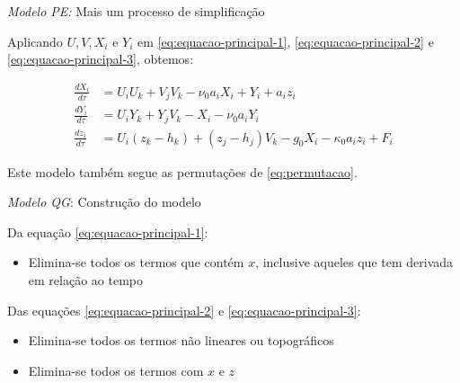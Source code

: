 
\begin{frame}{\textit{Modelo PE:} Mais um processo de simplificação}

Aplicando $U, V, X_i$ e $Y_i$ em \eqref{eq:equacao-principal-1}, \eqref{eq:equacao-principal-2} e \eqref{eq:equacao-principal-3}, obtemos:

\begin{align}
    \frac{dX_i}{d\tau} &= U_iU_k + V_jV_k - \nu_0a_iX_i + Y_i + a_iz_i \label{eq:equacao-principal-simplificada-1}\\
    \frac{dY_i}{d\tau} &= U_iY_k + Y_jV_k - X_i - \nu_0a_iY_i \label{eq:equacao-principal-simplificada-2}\\
    \frac{dz_i}{d\tau} &= U_i(z_k - h_k) + (z_j - h_j)V_k - g_0X_i - \kappa_0a_iz_i + F_i \label{eq:equacao-principal-simplificada-3}
\end{align}

Este modelo também segue as permutações de \eqref{eq:permutacao}.

\end{frame}


\begin{frame}{\textit{Modelo QG}: Construção do modelo}

Da equação \eqref{eq:equacao-principal-1}:
\begin{itemize}
    \item Elimina-se todos os termos que contém $x$, inclusive aqueles que tem derivada em relação ao tempo
\end{itemize}

Das equações \eqref{eq:equacao-principal-2} e \eqref{eq:equacao-principal-3}:
\begin{itemize}
    \item Elimina-se todos os termos não lineares ou topográficos 
    \item Elimina-se todos os termos com $x$ e $z$
\end{itemize}

\end{frame}


